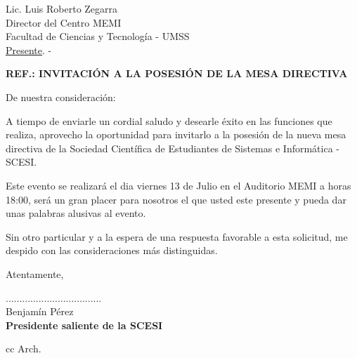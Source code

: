 \documentclass[letterpaper,12pt]{letter}
\begin{document}
\date {12 de julio de 2012}
\begin{letter}{Lic. Luis Roberto Zegarra \\ Director del Centro MEMI \\ Facultad de Ciencias y Tecnolog\'ia - UMSS \\ \underline {Presente}. -}

\begin{center}
	\opening{\textbf{REF.: INVITACI\'ON A LA POSESI\'ON DE LA MESA DIRECTIVA}}
\end{center}

De nuestra consideración:

A tiempo de enviarle un cordial saludo y desearle éxito en las funciones que realiza, aprovecho 
la oportunidad para invitarlo a la posesi\'on de la nueva mesa directiva de la Sociedad Cient\'ifica 
de Estudiantes de Sistemas e Inform\'atica - SCESI.

Este evento se realizar\'a el dia viernes 13 de Julio en el Auditorio MEMI a horas 18:00, ser\'a 
un gran placer para nosotros el que usted este presente y pueda dar unas palabras alusivas al evento.

Sin otro particular y a la espera de una respuesta favorable a esta solicitud, me despido con las 
consideraciones más distinguidas.

Atentamente,

\vspace{2.5cm}

\begin{center}
...................................\\
Benjam\'in P\'erez\\
{\bfseries Presidente saliente de la SCESI}
\end{center}
\vspace{1cm}
cc Arch.
\end{letter}
\end{document}

